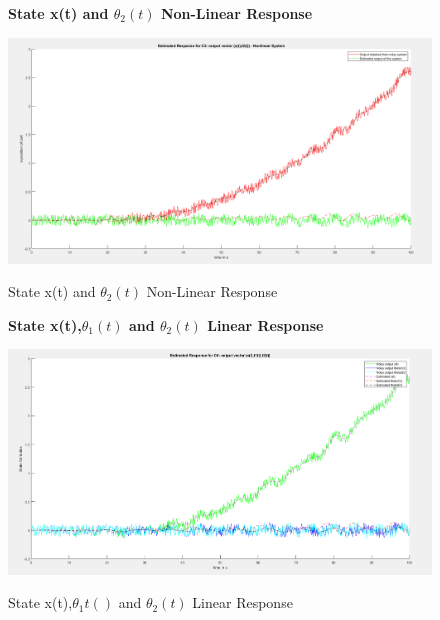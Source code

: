 \documentclass[12pt]{article}
\begin{document}
\begin{figure}[H]
    \centering
    \textbf{State x(t) and $\theta_2(t)$ Non-Linear Response}\par\medskip
    \includegraphics[scale = 0.35]{StateXth2NonLinearResponse.png}\\[0.0 cm]	%
    \caption{State x(t) and $\theta_2(t)$ Non-Linear Response} 
\end{figure}

\begin{figure}[H]
    \centering
    \textbf{State x(t),$\theta_1(t)$ and $\theta_2(t)$ Linear Response}\par\medskip
    \includegraphics[scale = 0.35]{StateXth1th2NonLinearResponse.png}\\[0.0 cm]	%
    \caption{State x(t),$\theta_1t()$ and $\theta_2(t)$ Linear Response} 
\end{figure}
\end{document}
